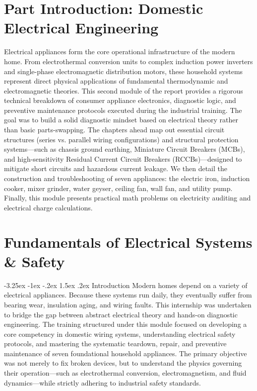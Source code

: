 \documentclass[11pt,a4paper]{report}
\makeatletter
\renewcommand{\section}{\@startsection{section}{1}{\z@}%
  {-3.25ex \@plus -1ex \@minus -.2ex}%
  {1.5ex \@plus.2ex}%
  {\normalfont\Large\bfseries\color{primaryColor}}}
\makeatother
\begin{document}
\chapter*{Part Introduction: Domestic Electrical Engineering}
Electrical appliances form the core operational infrastructure of the modern home. From electrothermal conversion units to complex induction power inverters and single-phase electromagnetic distribution motors, these household systems represent direct physical applications of fundamental thermodynamic and electromagnetic theories. This second module of the report provides a rigorous technical breakdown of consumer appliance electronics, diagnostic logic, and preventive maintenance protocols executed during the industrial training. The goal was to build a solid diagnostic mindset based on electrical theory rather than basic parts-swapping. The chapters ahead map out essential circuit structures (series vs. parallel wiring configurations) and structural protection systems—such as chassis ground earthing, Miniature Circuit Breakers (MCBs), and high-sensitivity Residual Current Circuit Breakers (RCCBs)—designed to mitigate short circuits and hazardous current leakage. We then detail the construction and troubleshooting of seven appliances: the electric iron, induction cooker, mixer grinder, water geyser, ceiling fan, wall fan, and utility pump. Finally, this module presents practical math problems on electricity auditing and electrical charge calculations.
\chapter{Fundamentals of Electrical Systems \& Safety}
\section{Introduction}
Modern homes depend on a variety of electrical appliances. Because these systems run daily, they eventually suffer from bearing wear, insulation aging, and wiring faults. This internship was undertaken to bridge the gap between abstract electrical theory and hands-on diagnostic engineering. The training structured under this module focused on developing a core competency in domestic wiring systems, understanding electrical safety protocols, and mastering the systematic teardown, repair, and preventive maintenance of seven foundational household appliances. The primary objective was not merely to fix broken devices, but to understand the physics governing their operation—such as electrothermal conversion, electromagnetism, and fluid dynamics—while strictly adhering to industrial safety standards.
\end{document}
